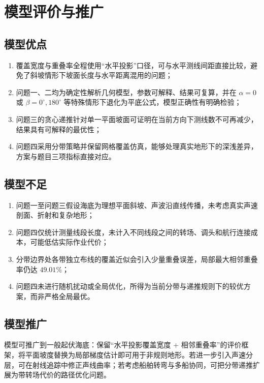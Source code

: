 \section{模型评价与推广}

\subsection{模型优点}

\begin{enumerate}
  \item 覆盖宽度与重叠率全程使用“水平投影”口径，可与水平测线间距直接比较，避免了斜坡情形下坡面长度与水平距离混用的问题；
  \item 问题一、二均为确定性解析几何模型，参数可解释、结果可复算，并在 $\alpha=0$ 或 $\beta=0^\circ,180^\circ$ 等特殊情形下退化为平底公式，模型正确性有明确检验；
  \item 问题三的贪心递推针对单一平面坡面可证明在当前方向下测线数不可再减少，结果具有可解释的最优性；
  \item 问题四采用分带策略并保留网格覆盖仿真，能够处理真实地形下的深浅差异，方案与题目三项指标直接对应。
\end{enumerate}

\subsection{模型不足}

\begin{enumerate}
  \item 问题一至问题三假设海底为理想平面斜坡、声波沿直线传播，未考虑真实声速剖面、折射和复杂地形；
  \item 问题四仅统计测量线段长度，未计入不同线段之间的转场、调头和航行连接成本，可能低估实际作业代价；
  \item 分带边界处各带独立布线的覆盖近似会引入少量重叠误差，局部最大相邻重叠率仍达 $49.01\%$；
  \item 问题四未进行随机扰动或全局优化，所得为当前分带与递推规则下的较优方案，而非严格全局最优。
\end{enumerate}

\subsection{模型推广}

模型可推广到一般起伏海底：保留“水平投影覆盖宽度 + 相邻重叠率”的评价框架，将平面坡度替换为局部梯度估计即可用于非规则地形。若进一步引入声速分层，可在射线追踪中修正声线曲率；若考虑船舶转弯与多船协同，可把分带递推扩展为带转场代价的路径优化问题。
